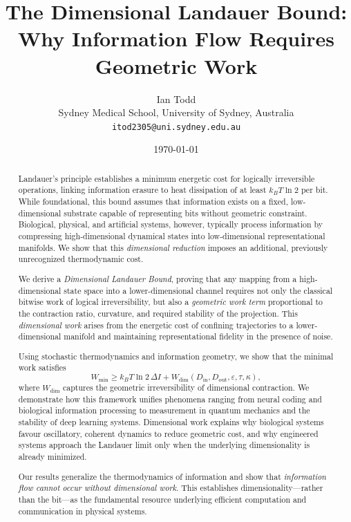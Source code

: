 \documentclass[12pt]{article}
\title{The Dimensional Landauer Bound:\\
Why Information Flow Requires Geometric Work}
\author{Ian Todd\\
\small Sydney Medical School, University of Sydney, Australia\\
\small \texttt{itod2305@uni.sydney.edu.au}}
\date{\today}
\begin{document}
\maketitle

\begin{abstract}
Landauer's principle establishes a minimum energetic cost for logically irreversible operations, linking information erasure to heat dissipation of at least $k_B T \ln 2$ per bit. While foundational, this bound assumes that information exists on a fixed, low-dimensional substrate capable of representing bits without geometric constraint. Biological, physical, and artificial systems, however, typically process information by compressing high-dimensional dynamical states into low-dimensional representational manifolds. We show that this \emph{dimensional reduction} imposes an additional, previously unrecognized thermodynamic cost.

We derive a \emph{Dimensional Landauer Bound}, proving that any mapping from a high-dimensional state space into a lower-dimensional channel requires not only the classical bitwise work of logical irreversibility, but also a \emph{geometric work term} proportional to the contraction ratio, curvature, and required stability of the projection. This \emph{dimensional work} arises from the energetic cost of confining trajectories to a lower-dimensional manifold and maintaining representational fidelity in the presence of noise.

Using stochastic thermodynamics and information geometry, we show that the minimal work satisfies
\[
W_{\min} \ge k_B T \ln 2\, \Delta I + W_{\mathrm{dim}}(D_{\mathrm{in}},D_{\mathrm{out}},\varepsilon,\tau,\kappa),
\]
where $W_{\mathrm{dim}}$ captures the geometric irreversibility of dimensional contraction. We demonstrate how this framework unifies phenomena ranging from neural coding and biological information processing to measurement in quantum mechanics and the stability of deep learning systems. Dimensional work explains why biological systems favour oscillatory, coherent dynamics to reduce geometric cost, and why engineered systems approach the Landauer limit only when the underlying dimensionality is already minimized.

Our results generalize the thermodynamics of information and show that \emph{information flow cannot occur without dimensional work}. This establishes dimensionality---rather than the bit---as the fundamental resource underlying efficient computation and communication in physical systems.
\end{abstract}
\end{document}
